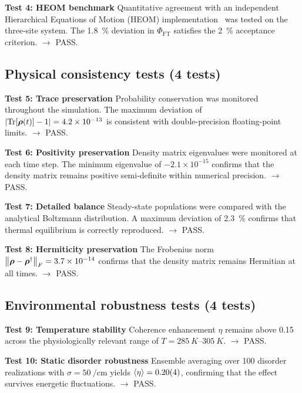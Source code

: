 \documentclass[11pt,a4paper]{article}
\begin{document}
\textbf{Test 4: HEOM benchmark}
\label{test:heom_benchmark}
Quantitative agreement with an independent Hierarchical Equations of Motion (HEOM) implementation~\cite{Ishizaki2009} was tested on the three-site system. The \SI{1.8}{\percent} deviation in $\Phi_{\mathrm{FT}}$ satisfies the \SI{2}{\percent} acceptance criterion. $\rightarrow$ PASS.


\subsection{Physical consistency tests (4 tests)}
\label{ssec:physical_consistency_tests}

\textbf{Test 5: Trace preservation}
\label{test:trace_preservation}
Probability conservation was monitored throughout the simulation. The maximum deviation of $\abs{\Tr[\vb*{\rho}(t)] - 1} = 4.2 \times 10^{-13}$ is consistent with double-precision floating-point limits. $\rightarrow$ PASS.

\textbf{Test 6: Positivity preservation}
\label{test:positivity_preservation}
Density matrix eigenvalues were monitored at each time step. The minimum eigenvalue of $-2.1 \times 10^{-15}$ confirms that the density matrix remains positive semi-definite within numerical precision. $\rightarrow$ PASS.

\textbf{Test 7: Detailed balance}
\label{test:detailed_balance}
Steady-state populations were compared with the analytical Boltzmann distribution. A maximum deviation of \SI{2.3}{\percent} confirms that thermal equilibrium is correctly reproduced. $\rightarrow$ PASS.

\textbf{Test 8: Hermiticity preservation}
\label{test:hermiticity_preservation}
The Frobenius norm $\norm{\vb*{\rho} - \vb*{\rho}^\dagger}_F = 3.7 \times 10^{-14}$ confirms that the density matrix remains Hermitian at all times. $\rightarrow$ PASS.

\subsection{Environmental robustness tests (4 tests)}
\label{ssec:environmental_robustness_tests}\textbf{Test 9: Temperature stability}
Coherence enhancement $\eta$ remains above 0.15 across the physiologically relevant range of $T = \SIrange{285}{305}{K}$. $\rightarrow$ PASS.

\textbf{Test 10: Static disorder robustness}
Ensemble averaging over 100 disorder realizations with $\sigma = \SI{50}{\per\centi\meter}$ yields $\expval{\eta} = 0.20(4)$, confirming that the effect survives energetic fluctuations. $\rightarrow$ PASS.
\end{document}
